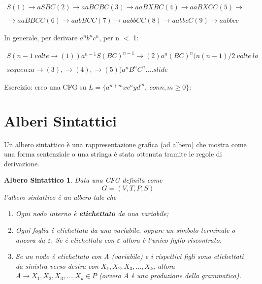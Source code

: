 \documentclass[11pt]{article}
\newtheorem{alberoSintattico}{Albero Sintattico}
\begin{document}
\begin{equation*}\label{stigeiz}\begin{split}
S (1)\rightarrow aSBC (2)\rightarrow aaBCBC (3)\rightarrow aaBXBC (4) \rightarrow aaBXCC (5) \rightarrow \\&\\ \rightarrow aaBBCC (6)\rightarrow aabBCC (7)\rightarrow aabbCC (8)\rightarrow aabbcC (9)\rightarrow aabbcc
\end{split}
\end{equation*}

In generale, per derivare $a^nb^nc^n$, per n $<$ 1:

\begin{equation*}
\begin{split}
S(n-1 \medspace volte \rightarrow (1)) a^{n-1}S(BC)^{n-1}\rightarrow (2) a^n(BC)^n(n(n-1)/2 \medspace volte \medspace la \\&\\ sequenza \rightarrow (3), \rightarrow (4), \rightarrow (5))a^nB^nC^n....slide
\end{split}
\end{equation*}

Esercizio: creo una CFG su $L = \{a^{n+m}xc^nyd^m, \medspace con n,m \geq 0\}$:


\section{Alberi Sintattici}
Un albero sintattico è una rappresentazione grafica (ad albero) che mostra come una forma sentenziale o una stringa è stata ottenuta tramite le regole di derivazione.

\begin{alberoSintattico}
Data una CFG definita come $$G=(V,T,P,S)$$ l'albero sintattico è un albero tale che
\begin{enumerate}
	\item Ogni nodo interno è \textbf{etichettato} da una variabile;
	\item Ogni foglia è etichettata da una variabile, oppure un simbolo terminale o ancora da $\varepsilon$. Se è etichettata con $\varepsilon$ allora è l'unico figlio riscontrato.
	\item Se un nodo è etichettato con A (variabile) e i rispettivi figli sono etichettati da sinistra verso destra con $X_1,X_2,X_3,...,X_k$, allora $A \rightarrow X_1,X_2,X_3,...,X_k \in P$ (ovvero A è una produzione della grammatica).
\end{enumerate}
\end{alberoSintattico}
\end{document}
